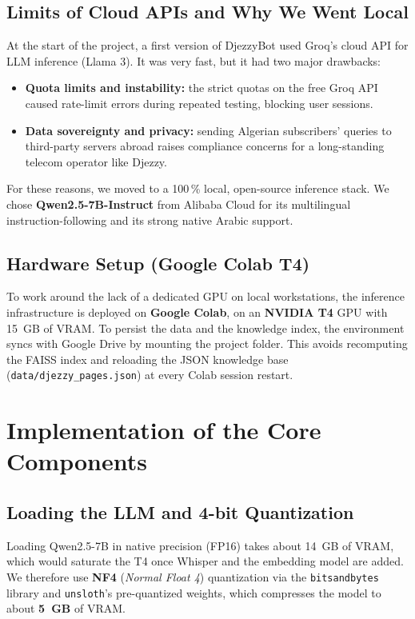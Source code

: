 \documentclass[12pt, a4paper]{report}
\newcommand{\humantext}[1]{#1}      %
\begin{document}
\subsection{Limits of Cloud APIs and Why We Went Local}
\humantext{At the start of the project, a first version of DjezzyBot used Groq's cloud API for LLM inference (Llama 3). It was very fast, but it had two major drawbacks:}
\begin{itemize}
    \item \humantext{\textbf{Quota limits and instability:} the strict quotas on the free Groq API caused rate-limit errors during repeated testing, blocking user sessions.}
    \item \humantext{\textbf{Data sovereignty and privacy:} sending Algerian subscribers' queries to third-party servers abroad raises compliance concerns for a long-standing telecom operator like Djezzy.}
\end{itemize}
\humantext{For these reasons, we moved to a 100\,\% local, open-source inference stack. We chose \textbf{Qwen2.5-7B-Instruct} from Alibaba Cloud for its multilingual instruction-following and its strong native Arabic support.}

\subsection{Hardware Setup (Google Colab T4)}
\humantext{To work around the lack of a dedicated GPU on local workstations, the inference infrastructure is deployed on \textbf{Google Colab}, on an \textbf{NVIDIA T4} GPU with 15~GB of VRAM. To persist the data and the knowledge index, the environment syncs with Google Drive by mounting the project folder. This avoids recomputing the FAISS index and reloading the JSON knowledge base (\texttt{data/djezzy\_pages.json}) at every Colab session restart.}

\section{Implementation of the Core Components}

\subsection{Loading the LLM and 4-bit Quantization}
\humantext{Loading Qwen2.5-7B in native precision (FP16) takes about 14~GB of VRAM, which would saturate the T4 once Whisper and the embedding model are added. We therefore use \textbf{NF4} (\textit{Normal Float 4}) quantization via the \texttt{bitsandbytes} library and \texttt{unsloth}'s pre-quantized weights, which compresses the model to about \textbf{5~GB} of VRAM.}
\end{document}

